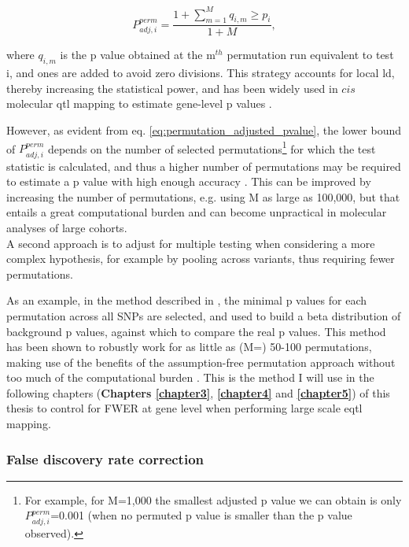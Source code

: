 \begin{equation}\label{eq:permutation_adjusted_pvalue}
    P_{adj,i}^{perm} = \frac{1+\sum_{m=1}^{M} q_{i,m} \geq p_i}{1+M},
\end{equation}

where $q_{i,m}$ is the p value obtained at the m$^{th}$ permutation run equivalent to test i, and ones are added to avoid zero divisions.  
This strategy accounts for local \gls{ld}, thereby increasing the statistical power, and has been widely used in $cis$ molecular \gls{qtl} mapping to estimate gene-level p values \cite{gtex2015genotype, sudmant2015integrated}. 

However, as evident from eq. \eqref{eq:permutation_adjusted_pvalue}, the lower bound of $P_{adj,i}^{perm}$ depends on the number of selected permutations\footnote{For example, for M=1,000 the smallest adjusted p value we can obtain is only $P_{adj,i}^{perm}$=0.001 (when no permuted p value is smaller than the p value observed).} for which the test statistic is calculated, and thus a higher number of permutations may be required to estimate a p value with high enough accuracy \cite{sul2015accurate}.
This can be improved by increasing the number of permutations, e.g. using M as large as 100,000, but that entails a great computational burden and can become unpractical in molecular analyses of large cohorts.
\\

A second approach is to adjust for multiple testing when considering a more complex hypothesis, for example by pooling across variants, thus requiring fewer permutations.

As an example, in the method described in \cite{ongen2016fast}, the minimal p values for each permutation across all SNPs are selected, and used to build a beta distribution of background p values, against which to compare the real p values.
This method has been shown to robustly work for as little as (M=) 50-100 permutations, making use of the benefits of the assumption-free permutation approach without too much of the computational burden \cite{ongen2016fast}. 
This is the method I will use in the following chapters (\textbf{Chapters \ref{chapter3}}, \textbf{\ref{chapter4}} and \textbf{\ref{chapter5}}) of this thesis to control for FWER at gene level when performing large scale \gls{eqtl} mapping.

\subsubsection{False discovery rate correction}

